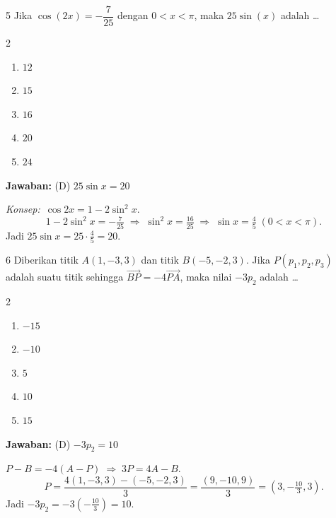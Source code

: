 \documentclass[11pt]{article}
\newcommand{\jawaban}[1]{%
  \noindent\colorbox{gold!30}{\parbox{\dimexpr\linewidth-2\fboxsep\relax}{%
    \textbf{Jawaban:} #1}}\par\smallskip}
\newcommand{\konsep}{\noindent\textit{Konsep:}\ \ignorespaces}
\newenvironment{pilB}{%
  \par\smallskip\begin{multicols}{2}
  \begin{enumerate}[label=(\Alph*),leftmargin=*,itemsep=1pt,topsep=3pt]}%
  {\end{enumerate}\end{multicols}}
\begin{document}
\begin{soal}{5}
Jika $\cos(2x)=-\dfrac{7}{25}$ dengan $0<x<\pi$,
maka $25\sin(x)$ adalah \ldots
\begin{pilB}
  \item $12$ \item $15$ \item $16$ \item $20$ \item $24$
\end{pilB}
\end{soal}
\begin{pembox}
\jawaban{(D) $25\sin x=20$}
\konsep $\cos 2x=1-2\sin^2 x$.
\[ 1-2\sin^2 x=-\tfrac{7}{25}\;\Rightarrow\;\sin^2 x=\tfrac{16}{25}\;\Rightarrow\;\sin x=\tfrac{4}{5}\;(0<x<\pi). \]
Jadi $25\sin x=25\cdot\tfrac{4}{5}=20$.
\end{pembox}

\begin{soal}{6}
Diberikan titik $A(1,-3,3)$ dan titik $B(-5,-2,3)$. Jika
$P(p_1,p_2,p_3)$ adalah suatu titik sehingga
$\overrightarrow{BP}=-4\overrightarrow{PA}$,
maka nilai $-3p_2$ adalah \ldots
\begin{pilB}
  \item $-15$ \item $-10$ \item $5$ \item $10$ \item $15$
\end{pilB}
\end{soal}
\begin{pembox}
\jawaban{(D) $-3p_2=10$}
$P-B=-4(A-P)\;\Rightarrow\;3P=4A-B$.
\[ P=\frac{4(1,-3,3)-(-5,-2,3)}{3}=\frac{(9,-10,9)}{3}=\!\left(3,-\tfrac{10}{3},3\right). \]
Jadi $-3p_2=-3\!\left(-\tfrac{10}{3}\right)=10$.
\end{pembox}
\end{document}
